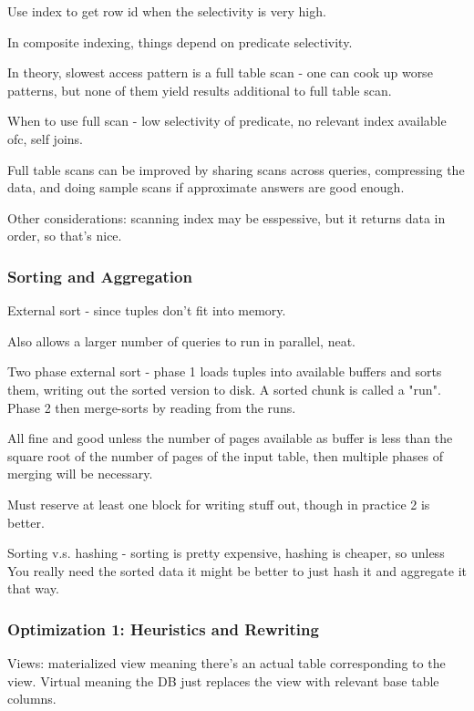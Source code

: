 \documentclass{article}
\begin{document}
			Use index to get row id when the selectivity is very high.
			
			In composite indexing, things depend on predicate selectivity.
			
			In theory, slowest access pattern is a full table scan - one can cook up worse patterns, but none of them yield results additional to full table scan.
			
			When to use full scan - low selectivity of predicate, no relevant index available ofc, self joins.
			
			Full table scans can be improved by sharing scans across queries, compressing the data, and doing sample scans if approximate answers are good enough.
			
			Other considerations: scanning index may be esspessive, but it returns data in order, so that's nice.
			
		\subsubsection{Sorting and Aggregation}
		
			External sort - since tuples don't fit into memory.
			
			Also allows a larger number of queries to run in parallel, neat.
			
			Two phase external sort - phase 1 loads tuples into available buffers and sorts them, writing out the sorted version to disk. A sorted chunk is called a "run". Phase 2 then merge-sorts by reading from the runs.
			
			All fine and good unless the number of pages available as buffer is less than the square root of the number of pages of the input table, then multiple phases of merging will be necessary.
			
			Must reserve at least one block for writing stuff out, though in practice 2 is better.
			
			Sorting v.s. hashing - sorting is pretty expensive, hashing is cheaper, so unless You really need the sorted data it might be better to just hash it and aggregate it that way.
			
		\subsubsection{Optimization 1: Heuristics and Rewriting}
		
			Views: materialized view meaning there's an actual table corresponding to the view. Virtual meaning the DB just replaces the view with relevant base table columns. 
			
\end{document}
